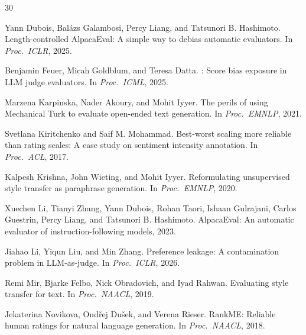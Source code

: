 \documentclass[11pt]{article}
\begin{document}
\begin{thebibliography}{30}

Yann Dubois, Bal{\'a}zs Galambosi, Percy Liang, and Tatsunori B. Hashimoto.
\newblock Length-controlled AlpacaEval: A simple way to debias automatic evaluators.
\newblock In \emph{Proc.\ ICLR}, 2025.

Benjamin Feuer, Micah Goldblum, and Teresa Datta.
: Score bias exposure in LLM judge evaluators.
\newblock In \emph{Proc.\ ICML}, 2025.

Marzena Karpinska, Nader Akoury, and Mohit Iyyer.
\newblock The perils of using Mechanical Turk to evaluate open-ended text generation.
\newblock In \emph{Proc.\ EMNLP}, 2021.

Svetlana Kiritchenko and Saif M. Mohammad.
\newblock Best-worst scaling more reliable than rating scales: A case study on sentiment intensity annotation.
\newblock In \emph{Proc.\ ACL}, 2017.

Kalpesh Krishna, John Wieting, and Mohit Iyyer.
\newblock Reformulating unsupervised style transfer as paraphrase generation.
\newblock In \emph{Proc.\ EMNLP}, 2020.

Xuechen Li, Tianyi Zhang, Yann Dubois, Rohan Taori, Ishaan Gulrajani, Carlos Guestrin, Percy Liang, and Tatsunori B. Hashimoto.
\newblock AlpacaEval: An automatic evaluator of instruction-following models, 2023.

Jiahao Li, Yiqun Liu, and Min Zhang.
\newblock Preference leakage: A contamination problem in LLM-as-judge.
\newblock In \emph{Proc.\ ICLR}, 2026.

Remi Mir, Bjarke Felbo, Nick Obradovich, and Iyad Rahwan.
\newblock Evaluating style transfer for text.
\newblock In \emph{Proc.\ NAACL}, 2019.

Jekaterina Novikova, Ond\v{r}ej Du\v{s}ek, and Verena Rieser.
\newblock RankME: Reliable human ratings for natural language generation.
\newblock In \emph{Proc.\ NAACL}, 2018.


\end{thebibliography}
\end{document}
